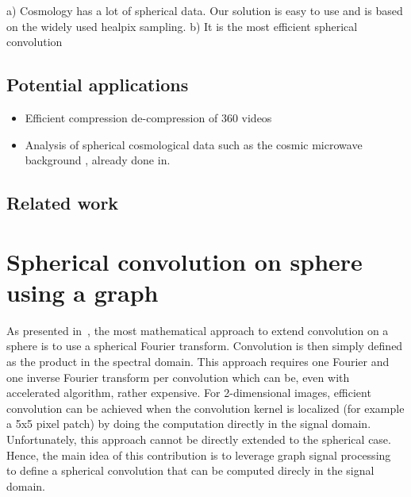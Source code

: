 \documentclass[preprint,12pt,authoryear]{elsarticle}
\newcommand{\nati}[1]{{\color[rgb]{.1,.6,.1}{#1}}}
\newcommand{\assign}[1]{{\color[rgb]{.8,.5,.8}{Assigned: #1 }}}
\begin{document}
a) Cosmology has a lot of spherical data. Our solution is easy to use and is based on the widely used healpix sampling.
b) It is the most efficient spherical convolution

\subsection{Potential applications}
	\assign{Tomek, Nathanael, Michael}

\begin{itemize}

	\item Efficient compression de-compression of 360 videos\cite{su2017learning}
	\item Analysis of spherical cosmological data such as the cosmic microwave background \cite{...}, already done in\cite{he2018analysis}.
\end{itemize}


\subsection{Related work}
\assign{Nathanael, Michael}
\label{sec:related}
\cite{cohen2017convolutional} 
\cite{cohen2018spherical}
\cite{boomsma2017spherical}
\cite{defferrard2016convolutional}

\nati{+ add other graph CNN approaches \cite{...}}

\section{Spherical convolution on sphere using a graph}
\assign{Nathanael}

As presented in~\cite{cohen2018spherical}, the most mathematical approach to extend convolution on a sphere is to use a spherical Fourier transform. Convolution is then simply defined as the product in the spectral domain. This approach requires one Fourier and one inverse Fourier transform per convolution which can be, even with accelerated algorithm, rather expensive. For 2-dimensional images, efficient convolution can be achieved when the convolution kernel is localized (for example a 5x5 pixel patch) by doing the computation directly in the signal domain. Unfortunately, this approach cannot be directly extended to the spherical case. Hence, the main idea of this contribution is to leverage graph signal processing~\cite{shuman2013emerging} to define a spherical convolution that can be computed direcly in the signal domain. 
\end{document}
